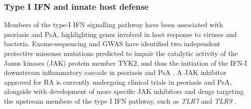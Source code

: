 \subsubsection*{Type I IFN and innate host defense}

Members of the type-I IFN signalling pathway have been associated with psoriasis and PsA, highlighting genes involved in host response to viruses and bacteria. 
Exome-sequencing and GWAS have identified two independent protective missense mutations predicted to impair the catalytic activity of the Janus kinases (JAK) protein member TYK2, and thus the initiation of the IFN-I downstream inflammatory cascade in psoriasis and PsA \parencite{Strange2010, Tsoi2012, Dand2017}. A JAK inhibitor approved for RA is currently undergoing clinical trials in psoriasis and PsA, alongside with development of more specific JAK inhibitors and drugs targeting the upstream members of the type I IFN pathway, such as \textit{TLR7} and \textit{TLR9} \parencite{Yogo2016,Baker2017}.

